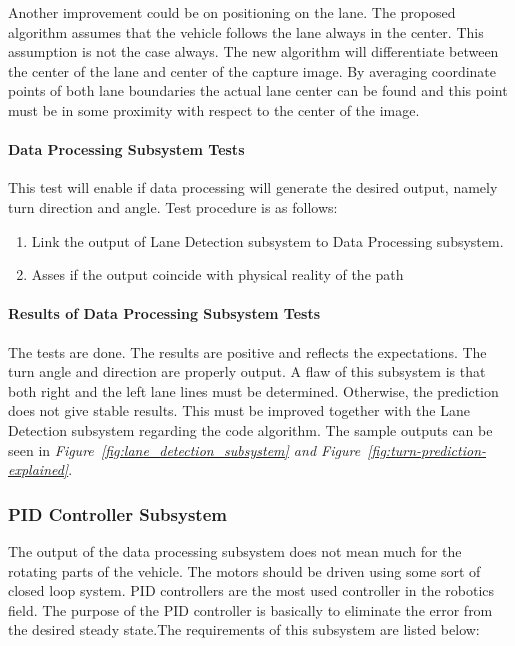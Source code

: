 \documentclass[a4paper,12pt]{article}
\begin{document}
		Another improvement could be on positioning on the lane. The proposed algorithm assumes that the vehicle follows the lane always in the center. This assumption is not the case always. The new algorithm will differentiate between the center of the lane and center of the capture image. By averaging coordinate points of both lane boundaries the actual lane center can be found and this point must be in some proximity with respect to the center of the image.
		
	\paragraph{Data Processing Subsystem Tests}	
		This test will enable if data processing will generate the desired output, namely turn direction and angle. Test procedure is as follows:
		\begin{enumerate}
			\item Link the output of Lane Detection subsystem to Data Processing subsystem. \vspace{-0.2cm}
			\item Asses if the output coincide with physical reality of the path \vspace{-0.2cm}
		\end{enumerate}
	\paragraph{Results of Data Processing Subsystem Tests}
	The tests are done. The results are positive and reflects the expectations. The turn angle and direction are properly output. A flaw of this subsystem is that both right and the left lane lines must be determined. Otherwise, the prediction does not give stable results. This must be improved together with the Lane Detection subsystem regarding the code algorithm.	The sample outputs can be seen in \textit{Figure~\ref{fig:lane_detection_subsystem} and Figure~\ref{fig:turn-prediction-explained}}.
	
	\subsubsection{PID Controller Subsystem}
	
	The output of the data processing subsystem does not mean much for the rotating parts of the vehicle. The motors should be driven using some sort of closed loop system. PID controllers are the most used controller in the robotics field. The purpose of the PID controller is basically to eliminate the error from the desired steady state.The requirements of this subsystem are listed below:
	
\end{document}
